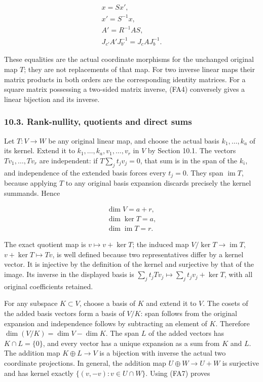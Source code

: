 \documentclass[
  11pt,
]{article}
\begin{document}
\[
\begin{gathered}
x=Sx', \\  x'=S^{-1}x, \\  A'=R^{-1}AS, \\ J_{c'}A'J_{b'}^{-1}=J_cAJ_b^{-1}.
\end{gathered}
\tag{FA6}
\]

These equalities are the actual coordinate morphisms for the unchanged
original map \(T\); they are not replacements of that map. For two
inverse linear maps their matrix products in both orders are the
corresponding identity matrices. For a square matrix possessing a
two-sided matrix inverse, (FA4) conversely gives a linear bijection and
its inverse.

\subsubsection{10.3. Rank-nullity, quotients and direct
sums}\label{rank-nullity-quotients-and-direct-sums}

Let \(T:V\to W\) be any original linear map, and choose the actual basis
\(k_1,\ldots,k_a\) of its kernel. Extend it to
\(k_1,\ldots,k_a,v_1,\ldots,v_r\) in \(V\) by Section 10.1. The vectors
\(Tv_1,\ldots,Tv_r\) are independent: if \(T\sum_j t_jv_j=0\), that sum
is in the span of the \(k_i\), and independence of the extended basis
forces every \(t_j=0\). They span \(\operatorname{im}T\), because
applying \(T\) to any original basis expansion discards precisely the
kernel summands. Hence

\[
\begin{gathered}
\dim V=a+r, \\  \dim\ker T=a, \\ \dim\operatorname{im}T=r.
\end{gathered}
\tag{FA7}
\]

The exact quotient map is \(v\mapsto v+\ker T\); the induced map
\(V/\ker T\to\operatorname{im}T\), \(v+\ker T\mapsto Tv\), is well
defined because two representatives differ by a kernel vector. It is
injective by the definition of the kernel and surjective by that of the
image. Its inverse in the displayed basis is
\(\sum_j t_jTv_j\mapsto\sum_j t_jv_j+\ker T\), with all original
coefficients retained.

For any subspace \(K\subset V\), choose a basis of \(K\) and extend it
to \(V\). The cosets of the added basis vectors form a basis of \(V/K\):
span follows from the original expansion and independence follows by
subtracting an element of \(K\). Therefore \(\dim(V/K)=\dim V-\dim K\).
The span \(L\) of the added vectors has \(K\cap L=\{0\}\), and every
vector has a unique expansion as a sum from \(K\) and \(L\). The
addition map \(K\oplus L\to V\) is a bijection with inverse the actual
two coordinate projections. In general, the addition map
\(U\oplus W\to U+W\) is surjective and has kernel exactly
\(\{(v,-v):v\in U\cap W\}\). Using (FA7) proves
\end{document}
